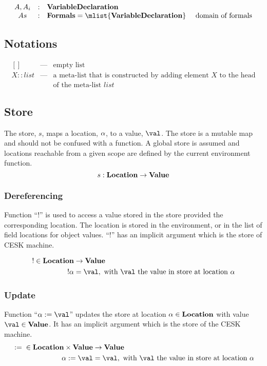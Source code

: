 \documentclass{article}
\begin{document}
\[
  \begin{array}{ccll}
	\formal, \formali{i} & : & \dvardecl\\
	\formals & : & \dformals = \mlist{\dvardecl} &\textrm{ domain of formals}\\

  \end{array}
\]

\subsection{Notations}
\label{subsec:notations}

\[
  \begin{array}{lcl}
    [] &\text{---}& \text{empty list}\\
    X :: list &\text{---}& \text{a meta-list that is constructed by adding element $X$ to the head}\\
    && \text{of the meta-list $list$}
  \end{array}
\]

\subsection{Store}
\label{subsec:store-definition}
The store, $s$, maps a location, $\alpha$, to a value, $\val$.
The store is a mutable map and should not be confused with a function.
A global store is assumed and locations reachable from a given scope are defined by the current environment function.
\[s : \mathbf{Location} \rightarrow \mathbf{Value} \]
\subsubsection{Dereferencing}
\label{subsubsection:dereferecing}
\newcommand{\deref}[1]{!#1}
Function ``$\deref{}$'' is used to access a value stored in the store provided the corresponding location.
The location is stored in the environment, or in the list of field locations for object values.
``$\deref{}$'' has an implicit argument which is the store of CESK machine.

\begin{align*}
  \deref{} \in \dlocation &\rightarrow \dval \\
  \deref{\loc} &=  \val, \textrm{ with $\val$ the value in store at location } \loc
\end{align*}
\subsubsection{Update}
\label{subsubsec:store-update}
\newcommand{\update}[2]{{#1} := {#2}}
Function ``$\update{\loc}{\val}$'' updates the store at location $\alpha \in \mathbf{Location}$ with value $\val \in \dval$.
It has an implicit argument which is the store of the CESK machine.
\begin{align*}
  \update{}{} \in \dlocation \times \dval &\rightarrow  \dval\\
  \update{\loc}{\val} &= \val, \textrm{ with $\val$ the value in store at location $\loc$}
\end{align*}
\end{document}
